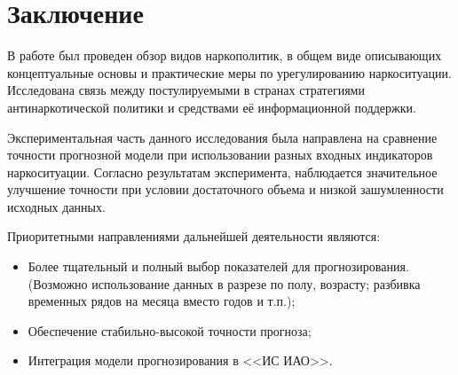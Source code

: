 \documentclass[a4paper,14pt]{article}
\begin{document}
\newpage
\section*{Заключение}

В работе был проведен обзор видов наркополитик, в общем виде описывающих 
концептуальные основы и практические меры по урегулированию наркоситуации.  
Исследована связь между постулируемыми в странах стратегиями антинаркотической 
политики и средствами её информационной поддержки.

Экспериментальная часть данного исследования была направлена на сравнение 
точности прогнозной модели при использовании разных входных индикаторов 
наркоситуации.  Согласно результатам эксперимента, наблюдается значительное 
улучшение точности при условии достаточного объема и низкой зашумленности 
исходных данных. 

Приоритетными направлениями дальнейшей деятельности являются:
\begin{itemize}
    \item Более тщательный и полный выбор показателей для прогнозирования. 
        (Возможно использование данных в разрезе по полу, возрасту; разбивка 
        временных рядов на месяца вместо годов и т.п.);
    \item Обеспечение стабильно-высокой точности прогноза;
    \item Интеграция модели прогнозирования в <<ИС ИАО>>.
\end{itemize}

\newpage
\printbibliography[heading=bibintoc]
\end{document}
